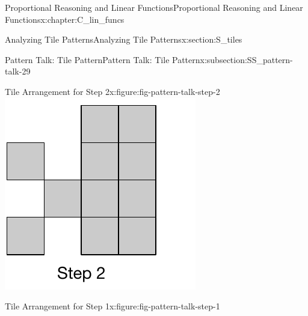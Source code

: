 \documentclass[oneside,10pt,]{book}
\numberwithin{equation}{chapter}
\begin{document}
\begin{chapterptx}{Proportional Reasoning and Linear Functions}{}{Proportional Reasoning and Linear Functions}{}{}{x:chapter:C_lin_funcs}
\begin{sectionptx}{Analyzing Tile Patterns}{}{Analyzing Tile Patterns}{}{}{x:section:S_tiles}
\begin{subsectionptx}{Pattern Talk: Tile Pattern}{}{Pattern Talk: Tile Pattern}{}{}{x:subsection:SS_pattern-talk-29}
\begin{sidebyside}{2}{0}{0}{0}
\begin{sbspanel}{0.5}
\begin{figureptx}{Tile Arrangement for Step 2}{x:figure:fig-pattern-talk-step-2}{}
\includegraphics[width=\linewidth]{external/pattern-talk-step-2.pdf}
\tcblower
\end{figureptx}%
\end{sbspanel}%
\end{sidebyside}%
\begin{figureptx}{Tile Arrangement for Step 1}{x:figure:fig-pattern-talk-step-1}{}%
\begin{image}{0.25}{0.5}{0.25}%

\end{image}
\end{figureptx}
\end{subsectionptx}
\end{sectionptx}
\end{chapterptx}
\end{document}
